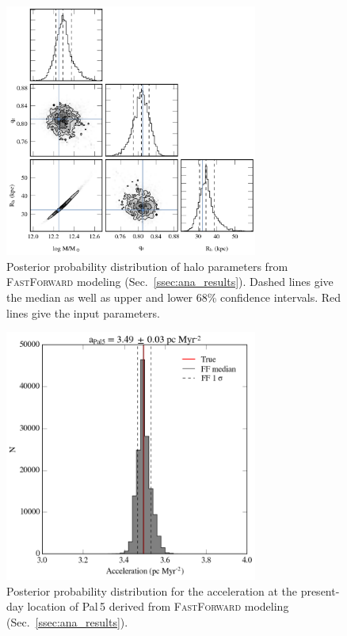 \begin{figure}
\includegraphics[width=83mm]{./figures/ana_results.png}
  \caption{Posterior probability distribution of halo parameters from \textsc{FastForward} modeling (Sec.~\ref{ssec:ana_results}). Dashed lines give the median as well as upper and lower 68\% confidence intervals. Red lines give the input parameters.}
  \label{plot_ana_results}
\end{figure}

\begin{figure}
\includegraphics[width=83mm]{./figures/ana_acc.png}
  \caption{Posterior probability distribution for the acceleration at the present-day location of Pal\,5 derived from \textsc{FastForward} modeling (Sec.~\ref{ssec:ana_results}).}
  \label{plot_ana_acc}
\end{figure}

